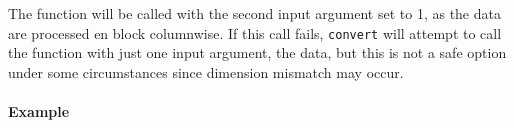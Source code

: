 The function will be called with the second input argument set to 1, as
the data are processed en block columnwise. If this call fails,
\texttt{convert} will attempt to call the function with just one input
argument, the data, but this is not a safe option under some
circumstances since dimension mismatch may occur.

\paragraph{Example}\label{example}


